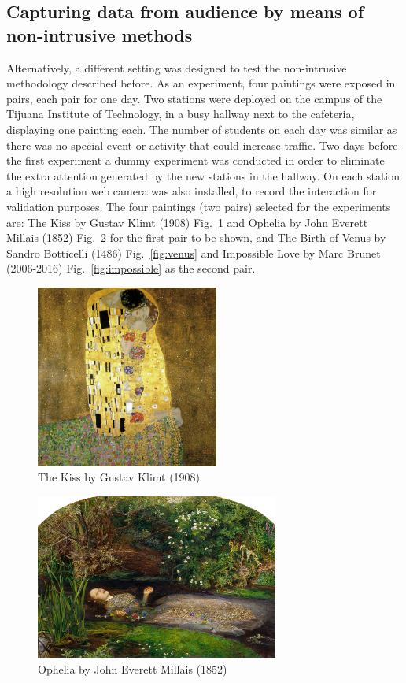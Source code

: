 \documentclass[graybox]{svmult}
\begin{document}
\subsection{Capturing data from audience by means of non-intrusive methods}
Alternatively, a different setting was designed to test the non-intrusive methodology described before.
As an experiment, four paintings were exposed in pairs, each pair for one day. Two stations were deployed on the campus of the Tijuana Institute of Technology, in a busy hallway next to the cafeteria, displaying one painting each. The number of students on each day was similar as there was no special event or activity that could increase traffic. Two days before the first experiment a dummy experiment was conducted in order to eliminate the extra attention generated by the new stations in the hallway.
On each station a high resolution web camera was also installed, to record the interaction for validation purposes. The four paintings (two pairs) selected for the experiments are: The Kiss by Gustav Klimt (1908) Fig.~\ref{fig:kiss} and Ophelia by John Everett Millais (1852) Fig.~\ref{fig:ophelia} for the first pair to be shown, and The Birth of Venus by Sandro Botticelli (1486) Fig.~\ref{fig:venus} and Impossible Love by Marc Brunet (2006-2016) Fig.~\ref{fig:impossible} as the second pair.

\begin{figure}[t]
\centering 
\includegraphics[width=6cm]{img/klimt-der-kuss-1908.jpg}
\caption{ The Kiss by Gustav Klimt (1908)}
\label{fig:kiss}       %
\end{figure}

\begin{figure}[t]
\centering 
\includegraphics[width=8cm]{img/Ophelia.jpg}
\caption{ Ophelia by John Everett Millais (1852)}
\label{fig:ophelia}       %
\end{figure}
\end{document}

